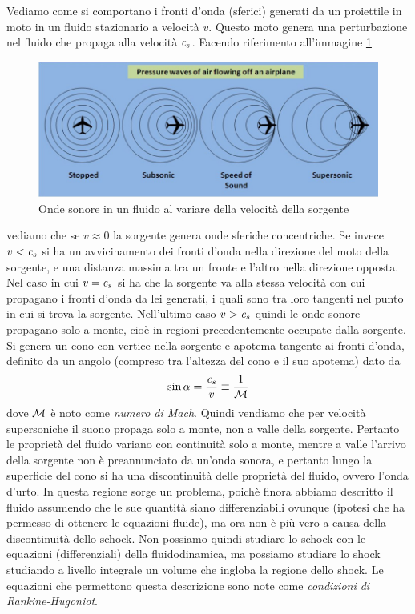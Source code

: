 Vediamo come si comportano i fronti d'onda (sferici) generati da un proiettile in moto in un fluido stazionario a velocità $v$. Questo moto genera una perturbazione nel fluido che propaga alla velocità $\textit{c}_{s}$. Facendo riferimento all'immagine \ref{im:Supersonic}
\begin{figure}[h!]
\includegraphics[width=\textwidth]{supersonic}
\caption{Onde sonore in un fluido al variare della velocità della sorgente} \label{im:Supersonic}
\end{figure}
vediamo che se $v \approx 0$ la sorgente genera onde sferiche concentriche. Se invece $v < \textit{c}_{s}$ si ha un avvicinamento dei fronti d'onda nella direzione del moto della sorgente, e una distanza massima tra un fronte e l'altro nella direzione opposta. Nel caso in cui $v = \textit{c}_{s}$ si ha che la sorgente va alla stessa velocità con cui propagano i fronti d'onda da lei generati, i quali sono tra loro tangenti nel punto in cui si trova la sorgente. Nell'ultimo caso $v >\textit{c}_{s}$ quindi le onde sonore propagano solo a monte, cioè in regioni precedentemente occupate dalla sorgente. Si genera un cono con vertice nella sorgente e apotema tangente ai fronti d'onda, definito da un angolo (compreso tra l'altezza del cono e il suo apotema) dato da
\begin{equation}
\sin \alpha = \dfrac{\textit{c}_{s}}{v} \equiv \dfrac{1}{\mathcal{M}}
\end{equation}
dove $\mathcal{M}$ è noto come \textit{numero di Mach}.
Quindi vendiamo che per velocità supersoniche il suono propaga solo a monte, non a valle della sorgente. Pertanto le proprietà del fluido variano con continuità solo a monte, mentre a valle l'arrivo della sorgente non è preannunciato da un'onda sonora, e pertanto lungo la superficie del cono si ha una discontinuità delle proprietà del fluido, ovvero l'onda d'urto. In questa regione sorge un problema, poichè finora abbiamo descritto il fluido assumendo che le sue quantità siano differenziabili ovunque (ipotesi che ha permesso di ottenere le equazioni fluide), ma ora non è più vero a causa della discontinuità dello schock. Non possiamo quindi studiare lo schock con le equazioni (differenziali) della fluidodinamica, ma possiamo studiare lo shock studiando a livello integrale un volume che ingloba la regione dello shock. Le equazioni che permettono questa descrizione sono note come \textit{condizioni di Rankine-Hugoniot}.

